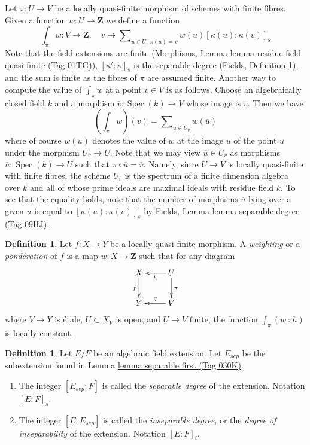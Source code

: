 \documentclass{amsart}
\theoremstyle{plain}
\theoremstyle{definition}
\newtheorem{definition}[subsection]{Definition}
\theoremstyle{remark}
\numberwithin{equation}{subsection}
\def\Spec{\mathop{\mathrm{Spec}}}
\begin{document}
\medskip\noindent
Let $\pi : U \to V$ be a locally quasi-finite morphism of schemes with
finite fibres. Given a function $w : U \to \mathbf{Z}$ we define a function
$$
\textstyle{\int}_\pi w : V \longrightarrow \mathbf{Z},\quad
v \longmapsto
\sum\nolimits_{u \in U,\ \pi(u) = v} w(u) [\kappa(u) : \kappa(v)]_s
$$
Note that the field extensions are finite
(Morphisms, Lemma \href{https://stacks.math.columbia.edu/tag/01TG}{lemma residue field quasi finite (Tag 01TG)}),
$[\kappa' : \kappa]_s$ is the separable degree
(Fields, Definition \ref{fields-definition-insep-degree}),
and the sum is finite as the fibres of $\pi$ are assumed finite.
Another way to compute the value of $\int_\pi w$ at a point $v \in V$
is as follows.
Choose an algebraically closed field $k$ and a morphism
$\overline{v} : \Spec(k) \to V$ whose image is $v$. Then we have
$$
(\textstyle{\int}_\pi w)(v) =
\sum\nolimits_{\overline{u} \in U_{\overline{v}}} w(\overline{u})
$$
where of course $w(\overline{u})$ denotes the value of $w$ at the
image $u$ of the point $\overline{u}$ under the morphism
$U_{\overline{v}} \to U$.
Note that we may view $\overline{u} \in U_{\overline{v}}$ as morphisms
$\overline{u} : \Spec(k) \to U$ such that
$\pi \circ \overline{u} = \overline{v}$. Namely, since
$U \to V$ is locally quasi-finite with finite fibres,
the scheme $U_{\overline{v}}$ is the spectrum
of a finite dimension algebra over $k$ and all of whose prime ideals
are maximal ideals with residue field $k$. To see that the equality
holds, note that the number of morphisms $\overline{u}$ lying over
a given $u$ is equal to $[\kappa(u) : \kappa(v)]_s$ by
Fields, Lemma \href{https://stacks.math.columbia.edu/tag/09HJ}{lemma separable degree (Tag 09HJ)}.



\begin{definition}
\label{definition-weighting}
Let $f : X \to Y$ be a locally quasi-finite morphism. A
{\it weighting} or a {\it pond\'eration} of $f$ is a map
$w : X \to \mathbf{Z}$ such that for any diagram
$$
\xymatrix{
X \ar[d]_f & U \ar[l]^h \ar[d]^\pi \\
Y & V \ar[l]_g
}
$$
where $V \to Y$ is \'etale, $U \subset X_V$ is open, and $U \to V$ finite,
the function $\int_\pi (w \circ h)$ is locally constant.
\end{definition}

\begin{definition}
\label{fields-definition-insep-degree}
Let $E/F$ be an algebraic field extension. Let $E_{sep}$ be the subextension
found in Lemma \href{https://stacks.math.columbia.edu/tag/030K}{lemma separable first (Tag 030K)}.
\begin{enumerate}
\item The integer $[E_{sep} : F]$ is called the {\it separable
degree} of the extension. Notation $[E : F]_s$.
\item The integer $[E : E_{sep}]$ is called the {\it inseparable
degree}, or the {\it degree of inseparability} of the extension.
Notation $[E : F]_i$.
\end{enumerate}
\end{definition}
\end{document}
